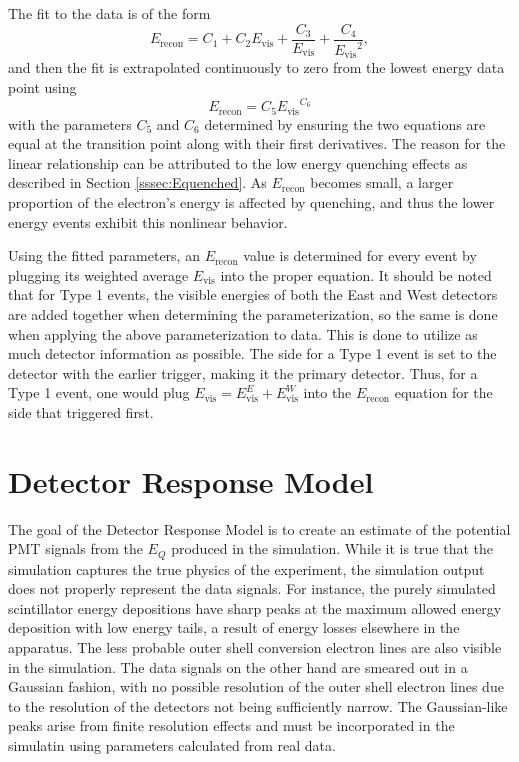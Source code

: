 The fit to the data is of the form
\begin{equation}
  E_{\mathrm{recon}} = C_1 + C_2E_{\mathrm{vis}} + \frac{C_3}{E_{\mathrm{vis}}} + \frac{C_4}{{E_{\mathrm{vis}}}^2},
\end{equation}
and then the fit is extrapolated continuously to zero from the lowest energy data point using
\begin{equation}
  E_{\mathrm{recon}} = C_5{E_{\mathrm{vis}}}^{C_6}
\end{equation}
with the parameters $C_5$ and $C_6$ determined by ensuring the two equations are equal at the
transition point along with their first derivatives. The reason for the linear relationship
can be attributed to the low energy quenching effects as described in Section \ref{sssec:Equenched}.
As $E_{\mathrm{recon}}$ becomes small, a larger proportion of the electron's energy is affected by quenching, and thus
the lower energy events exhibit this nonlinear behavior.

Using the fitted parameters, an $E_{\mathrm{recon}}$ value is determined
for every event by plugging its weighted average $E_{\mathrm{vis}}$ into the proper equation.
It should be noted that for Type 1 events, the visible energies of both the East and West
detectors are added together when determining the parameterization, so
the same is done when applying the above parameterization to data. This is done to utilize as much
detector information as possible. The side for a Type 1 event is set to
the detector with the earlier trigger, making it the primary detector.
Thus, for a Type 1
event, one would plug $E_{\mathrm{vis}} = E_{\mathrm{vis}}^E + E_{\mathrm{vis}}^W$ into the $E_{\mathrm{recon}}$
equation for the side that triggered first.

\section{Detector Response Model} \label{sec:DetectorResponseModel}
The goal of the Detector Response Model is to create an estimate of the potential PMT
signals from the $E_Q$ produced in the simulation. While it is true that the simulation
captures the true physics of the experiment, the simulation output does not properly
represent the data signals.
For instance, the purely simulated scintillator energy depositions have sharp peaks at the
maximum allowed energy deposition with low
energy tails, a result of energy losses elsewhere in the apparatus. The less probable outer shell
conversion electron lines are also visible in the simulation. The data signals
on the other hand are smeared out in a Gaussian fashion, with no possible
resolution of the outer shell electron lines due to the resolution of the detectors not
being sufficiently narrow.
The Gaussian-like peaks arise from finite resolution effects and
must be incorporated in the simulatin using parameters calculated
from real data.  


